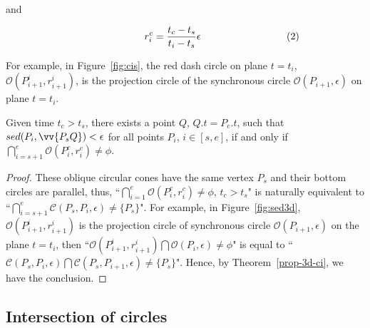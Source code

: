 and

\vspace{-2ex}
\begin{equation*}
\label{equ-proj-circle-r}
    \begin{aligned}
        \hspace{17ex}  r^c_i =\frac{t_c-t_s}{t_i-t_s}{\epsilon}   \hspace{20ex}(2) \\
    \end{aligned}
\end{equation*}
\vspace{-1ex}



For example, in Figure~\ref{fig:cis}, the red dash circle on plane $t=t_i$, \ie $\mathcal{O}(P^i_{i+1}, r^i_{i+1})$, is the projection circle of the synchronous circle $\mathcal{O}(P_{i+1}, \epsilon)$ on plane $t=t_i$.

\vspace{1ex}

\begin{cor}
\label{prop-circle-intersection}
Given time $t_c > t_s$, there exists a point $Q$, $Q.t = P_e.t$, such that $sed(P_i, \vv{P_sQ})<\epsilon$ for all points $P_i$, $i \in [s,e]$, if and only if $\bigcap_{i=s+1}^{e}{\mathcal{O}(P^c_i, r^c_i)} \ne \phi$.
\end{cor}


\begin{proof}
These oblique circular cones have the same vertex $P_s$ and their bottom circles are parallel, thus,
 ``$\bigcap_{i=1}^{e}{\mathcal{O}(P^c_i, r^c_i)} \ne \phi$, $t_c > t_s$" is naturally equivalent to ``$\bigcap_{i=s+1}^{e}{\mathcal{C}(P_s, P_i, \epsilon)} \ne \{P_s\}$".
For example, in Figure~\ref{fig:sed3d}, $\mathcal{O}(P^i_{i+1}, r^i_{i+1})$ is the projection circle of synchronous circle $\mathcal{O}(P_{i+1}, \epsilon)$ on the plane $t=t_i$, then ``${\mathcal{O}(P^i_{i+1}, r^i_{i+1})} \bigcap{\mathcal{O}(P_i, \epsilon)} \ne \phi$" is equal to ``$\mathcal{C}(P_s, P_i, \epsilon) \bigcap {\mathcal{C}(P_s, P_{i+1}, \epsilon)} \ne \{P_s\}$".
Hence, by Theorem~\ref{prop-3d-ci}, we have the conclusion.
\end{proof}


\subsection{Intersection of circles }

